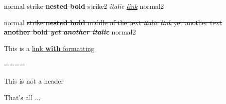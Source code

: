 normal \sout{strike \textbf{nested bold} strike2} \emph{italic \href{https://example.org}{link}} normal2

normal \sout{strike  \textbf{nested bold} middle of the text \emph{italic \href{https://example.org}{link}} yet another text \textbf{another bold \emph{yet another italic}} } normal2



This is a \href{https://example.org}{link \textbf{with} formatting}



====

This is not a header



That's all ...

